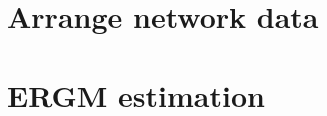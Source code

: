 \documentclass[
  letterpaper,
  DIV=11,
  numbers=noendperiod]{scrartcl}
\begin{document}
\section{Arrange network data}\label{arrange-network-data}

\section{ERGM estimation}\label{ergm-estimation}
\end{document}
